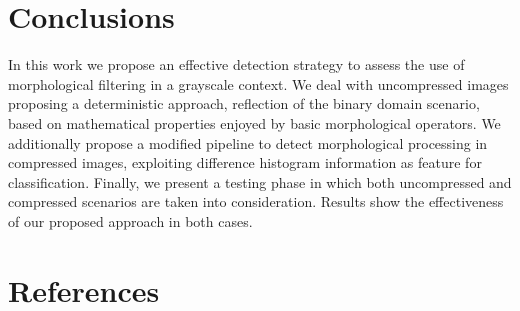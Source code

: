 \documentclass[review]{elsarticle}
\begin{document}
\section{Conclusions}
\label{sec:conclusions}
In this work we propose an effective detection strategy to assess the use of morphological filtering in a grayscale context. We deal with uncompressed images proposing a deterministic approach, reflection of the binary domain scenario, based on mathematical properties enjoyed by basic morphological operators. We additionally propose a modified pipeline to detect morphological processing in compressed images, exploiting difference histogram information as feature for  classification. Finally, we present a testing phase in which both uncompressed and compressed scenarios are taken into consideration. Results show the effectiveness of our proposed approach in both cases.  
 

\section*{References}


\newpage
\appendix
\end{document}

